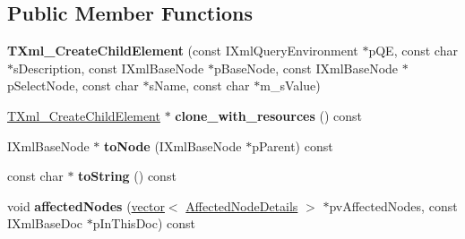 \subsection*{\-Public \-Member \-Functions}
\begin{DoxyCompactItemize}
\item 
\hypertarget{classgeneral__server_1_1TXml__CreateChildElement_a2fcbfa2e8c136b66b8bfd5911636ae7b}{{\bfseries \-T\-Xml\-\_\-\-Create\-Child\-Element} (const \-I\-Xml\-Query\-Environment $\ast$p\-Q\-E, const char $\ast$s\-Description, const \-I\-Xml\-Base\-Node $\ast$p\-Base\-Node, const \-I\-Xml\-Base\-Node $\ast$p\-Select\-Node, const char $\ast$s\-Name, const char $\ast$m\-\_\-s\-Value)}\label{classgeneral__server_1_1TXml__CreateChildElement_a2fcbfa2e8c136b66b8bfd5911636ae7b}

\item 
\hypertarget{classgeneral__server_1_1TXml__CreateChildElement_a2ccd5a35c7ca358ef598e1e913effef1}{\hyperlink{classgeneral__server_1_1TXml__CreateChildElement}{\-T\-Xml\-\_\-\-Create\-Child\-Element} $\ast$ {\bfseries clone\-\_\-with\-\_\-resources} () const }\label{classgeneral__server_1_1TXml__CreateChildElement_a2ccd5a35c7ca358ef598e1e913effef1}

\item 
\hypertarget{classgeneral__server_1_1TXml__CreateChildElement_adc34162ed149373d316549e416b4dd1f}{\-I\-Xml\-Base\-Node $\ast$ {\bfseries to\-Node} (\-I\-Xml\-Base\-Node $\ast$p\-Parent) const }\label{classgeneral__server_1_1TXml__CreateChildElement_adc34162ed149373d316549e416b4dd1f}

\item 
\hypertarget{classgeneral__server_1_1TXml__CreateChildElement_ad2885718965015b20bbaf7d215b69f89}{const char $\ast$ {\bfseries to\-String} () const }\label{classgeneral__server_1_1TXml__CreateChildElement_ad2885718965015b20bbaf7d215b69f89}

\item 
\hypertarget{classgeneral__server_1_1TXml__CreateChildElement_ad24d6f849613abe828f44c2de944a267}{void {\bfseries affected\-Nodes} (\hyperlink{classvector}{vector}$<$ \hyperlink{structgeneral__server_1_1TXml_1_1AffectedNodeDetails}{\-Affected\-Node\-Details} $>$ $\ast$pv\-Affected\-Nodes, const \-I\-Xml\-Base\-Doc $\ast$p\-In\-This\-Doc) const }\label{classgeneral__server_1_1TXml__CreateChildElement_ad24d6f849613abe828f44c2de944a267}

\end{DoxyCompactItemize}
